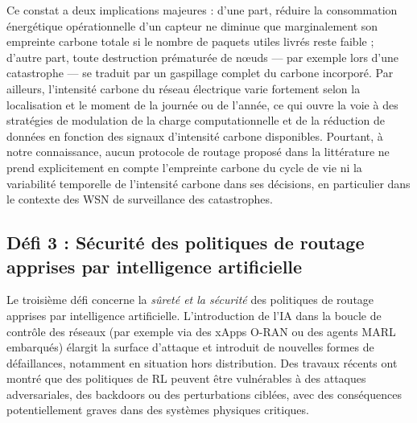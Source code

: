 Ce constat a deux implications majeures : d'une part, réduire la consommation énergétique opérationnelle d'un capteur ne diminue que marginalement son empreinte carbone totale si le nombre de paquets utiles livrés reste faible ; d'autre part, toute destruction prématurée de nœuds — par exemple lors d'une catastrophe — se traduit par un gaspillage complet du carbone incorporé\cite{pirson2021embodied,mersy2025lca_data}. Par ailleurs, l'intensité carbone du réseau électrique varie fortement selon la localisation et le moment de la journée ou de l'année, ce qui ouvre la voie à des stratégies de modulation de la charge computationnelle et de la réduction de données en fonction des signaux d'intensité carbone disponibles\cite{ember2024,uk_carbon_api,carbon_signals_acm2025}. Pourtant, à notre connaissance, aucun protocole de routage proposé dans la littérature ne prend explicitement en compte l'empreinte carbone du cycle de vie ni la variabilité temporelle de l'intensité carbone dans ses décisions, en particulier dans le contexte des WSN de surveillance des catastrophes\cite{freitag2021ict,aioti2024carbon,metaheuristic_wsn_slr2026}.

\subsection{Défi 3 : Sécurité des politiques de routage apprises par intelligence artificielle}

Le troisième défi concerne la \emph{sûreté et la sécurité} des politiques de routage apprises par intelligence artificielle. L'introduction de l'IA dans la boucle de contrôle des réseaux (par exemple via des xApps O-RAN ou des agents MARL embarqués) élargit la surface d'attaque et introduit de nouvelles formes de défaillances, notamment en situation hors distribution\cite{amodei2016concrete,garcia2015saferl,brunke2022safe}. Des travaux récents ont montré que des politiques de RL peuvent être vulnérables à des attaques adversariales, des backdoors ou des perturbations ciblées, avec des conséquences potentiellement graves dans des systèmes physiques critiques\cite{Huang2017AdvRL,Gleave2020AdvPolicies,Kiourti2021BackdoorDRL,subplay_marl2025}. 

